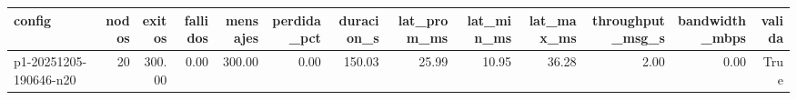 \begin{tabular}{lrrrrrrrrrrrr}
\toprule
config & nodos & exitos & fallidos & mensajes & perdida_pct & duracion_s & lat_prom_ms & lat_min_ms & lat_max_ms & throughput_msg_s & bandwidth_mbps & valida \\
\midrule
p1-20251205-190646-n20 & 20 & 300.00 & 0.00 & 300.00 & 0.00 & 150.03 & 25.99 & 10.95 & 36.28 & 2.00 & 0.00 & True \\
\bottomrule
\end{tabular}
